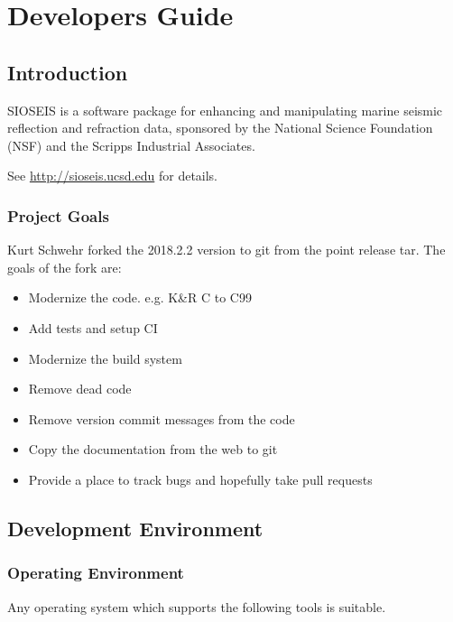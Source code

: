 \part{Developers Guide}
\chapter{Introduction}

SIOSEIS is a software package for enhancing and manipulating marine
seismic reflection and refraction data, sponsored by the National 
Science Foundation (NSF) and the Scripps Industrial Associates.

See \url{http://sioseis.ucsd.edu} for details.

\section{Project Goals}

Kurt Schwehr forked the 2018.2.2 version to git from the
point release tar.  The goals of the fork are:

\begin{itemize}
\item Modernize the code.  e.g. K\&R C to C99
\item Add tests and setup CI
\item Modernize the build system
\item Remove dead code
\item Remove version commit messages from the code
\item Copy the documentation from the web to git
\item Provide a place to track bugs and hopefully take pull requests
\end{itemize}

\chapter{Development Environment}

\section{Operating Environment}
Any operating system which supports the following tools is suitable.

